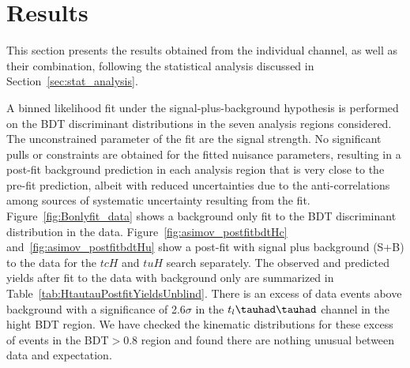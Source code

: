 \section{Results}
\label{sec:result}

This section presents the results obtained from the individual channel, as well as their combination,
following the statistical analysis discussed in Section~\ref{sec:stat_analysis}.

A binned likelihood fit under the signal-plus-background hypothesis is performed on the BDT discriminant distributions in the seven 
analysis regions considered. The unconstrained parameter of the fit are the signal 
strength.
No significant pulls or constraints are obtained for the fitted nuisance parameters, resulting in a post-fit background prediction in each analysis region that is
very close to the pre-fit prediction, albeit with reduced uncertainties due to the anti-correlations among sources of systematic uncertainty resulting from the fit.
Figure~\ref{fig:Bonlyfit_data} shows a background only fit to the BDT discriminant distribution in the data.
Figure~\ref{fig:asimov_postfitbdtHc} and~\ref{fig:asimov_postfitbdtHu} show a post-fit with signal plus background (S+B) to the data for
the $tcH$ and $tuH$ search separately.
The observed and predicted yields after fit to the data with background only are summarized in Table~\ref{tab:HtautauPostfitYieldsUnblind}.
There is an excess of data events above background with a significance of 2.6$\sigma$ in the $t_l\thadhad$ channel in the hight BDT region.
We have checked the kinematic distributions for these excess of events in
the BDT$>0.8$ region and found there are nothing unusual between data and expectation.

